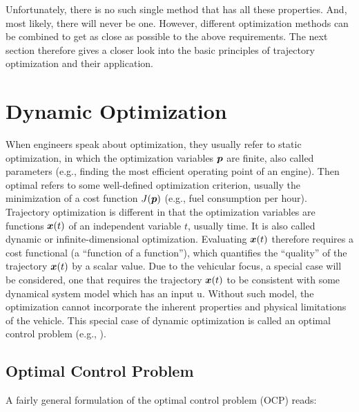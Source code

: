 Unfortunately, there is no such single method that has all these properties. And, most likely, there will never be one. However, different optimization methods can be combined to get as close as possible to the above requirements. The next section therefore gives a closer look into the basic principles of trajectory optimization and their application.

\section{Dynamic Optimization}\label{S:57.2}

When engineers speak about optimization, they usually refer to static optimization, in which the optimization variables  $\boldsymbol{p}$  are finite, also called parameters (e.g., finding the most efficient operating point of an engine). Then optimal refers to some well-defined optimization criterion, usually the minimization of a cost function $J(\boldsymbol{p})$ (e.g., fuel consumption per hour). 
Trajectory optimization is different in that the optimization variables are functions $\boldsymbol{x}(t)$ of an independent variable $t$, usually time. It is also called dynamic or infinite-dimensional optimization. Evaluating $\boldsymbol{x}(t)$ therefore requires a cost functional (a “function of a function”), which quantifies the “quality” of the trajectory $\boldsymbol{x}(t)$ by a scalar value. 
Due to the vehicular focus, a special case will be considered, one that requires the trajectory $\boldsymbol{x}(t)$ to be consistent with some dynamical system model which has an input u. Without such model, the optimization cannot incorporate the inherent properties and physical limitations of the vehicle. This special case of dynamic optimization is called an optimal control problem (e.g., \cite{Lewis_OC}).

\subsection{Optimal Control Problem}\label{S:57.2.1}
A fairly general formulation of the optimal control problem (OCP) reads:

